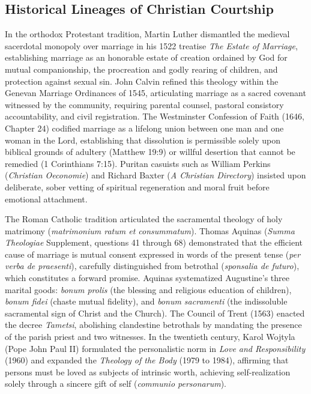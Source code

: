 \documentclass[11pt,twocolumn]{article}
\begin{document}
\subsection{Historical Lineages of Christian Courtship}
In the orthodox Protestant tradition, Martin Luther dismantled the medieval sacerdotal monopoly over marriage in his 1522 treatise \textit{The Estate of Marriage}, establishing marriage as an honorable estate of creation ordained by God for mutual companionship, the procreation and godly rearing of children, and protection against sexual sin. John Calvin refined this theology within the Genevan Marriage Ordinances of 1545, articulating marriage as a sacred covenant witnessed by the community, requiring parental counsel, pastoral consistory accountability, and civil registration. The Westminster Confession of Faith (1646, Chapter 24) codified marriage as a lifelong union between one man and one woman in the Lord, establishing that dissolution is permissible solely upon biblical grounds of adultery (Matthew 19:9) or willful desertion that cannot be remedied (1 Corinthians 7:15). Puritan casuists such as William Perkins (\textit{Christian Oeconomie}) and Richard Baxter (\textit{A Christian Directory}) insisted upon deliberate, sober vetting of spiritual regeneration and moral fruit before emotional attachment.

The Roman Catholic tradition articulated the sacramental theology of holy matrimony (\textit{matrimonium ratum et consummatum}). Thomas Aquinas (\textit{Summa Theologiae} Supplement, questions 41 through 68) demonstrated that the efficient cause of marriage is mutual consent expressed in words of the present tense (\textit{per verba de praesenti}), carefully distinguished from betrothal (\textit{sponsalia de futuro}), which constitutes a forward promise. Aquinas systematized Augustine's three marital goods: \textit{bonum prolis} (the blessing and religious education of children), \textit{bonum fidei} (chaste mutual fidelity), and \textit{bonum sacramenti} (the indissoluble sacramental sign of Christ and the Church). The Council of Trent (1563) enacted the decree \textit{Tametsi}, abolishing clandestine betrothals by mandating the presence of the parish priest and two witnesses. In the twentieth century, Karol Wojtyla (Pope John Paul II) formulated the personalistic norm in \textit{Love and Responsibility} (1960) and expanded the \textit{Theology of the Body} (1979 to 1984), affirming that persons must be loved as subjects of intrinsic worth, achieving self-realization solely through a sincere gift of self (\textit{communio personarum}).
\end{document}
